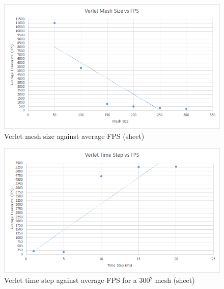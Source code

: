     \begin{figure}
    \begin{center}
      \includegraphics[scale=.9]{Figures/sheet_v_m_fps}
    \end{center}
    \caption{Verlet mesh size against average FPS (sheet)}
    \label{fig:v mesh fps sheet}
  \end{figure}
  
    \begin{figure}
    \begin{center}
      \includegraphics[scale=.9]{Figures/sheet_v_ts_fps}
    \end{center}
    \caption{Verlet time step against average FPS for a 300$^{2}$ mesh (sheet)}
    \label{fig:v step fps sheet}
  \end{figure}
  
